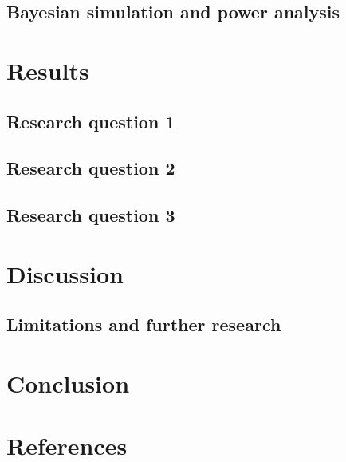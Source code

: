\documentclass[
  12pt]{article}
\begin{document}
\subsection{Bayesian simulation and power
analysis}\label{bayesian-simulation-and-power-analysis}

\section{Results}\label{sec-results}

\subsection{Research question 1}\label{sec-RQ1}

\subsection{Research question 2}\label{sec-RQ2}

\subsection{Research question 3}\label{sec-RQ3}

\section{Discussion}\label{sec-discussion}

\subsection{Limitations and further research}\label{sec-LFR}

\section{Conclusion}\label{sec-conclusion}

\section*{References}\label{references}

\renewcommand{\bibsection}{}

\end{document}
